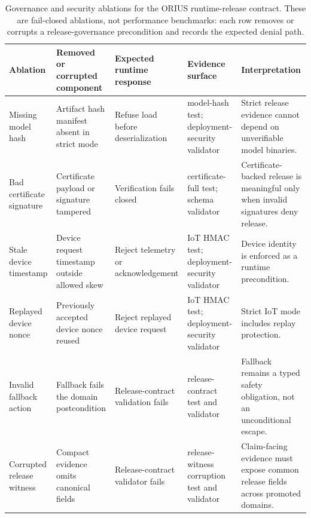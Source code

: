 \begin{table}[t]
\centering
\caption{Governance and security ablations for the ORIUS runtime-release contract. These are fail-closed ablations, not performance benchmarks: each row removes or corrupts a release-governance precondition and records the expected denial path.}
\label{tab:security-governance-ablations}
\footnotesize
\renewcommand{\arraystretch}{1.10}
\begin{tabularx}{\textwidth}{p{} p{} p{} p{} X}
\toprule
\textbf{Ablation} & \textbf{Removed or corrupted component} & \textbf{Expected runtime response} & \textbf{Evidence surface} & \textbf{Interpretation} \\
\midrule
Missing model hash & Artifact hash manifest absent in strict mode & Refuse load before deserialization & model-hash test; deployment-security validator & Strict release evidence cannot depend on unverifiable model binaries. \\
Bad certificate signature & Certificate payload or signature tampered & Verification fails closed & certificate-full test; schema validator & Certificate-backed release is meaningful only when invalid signatures deny release. \\
Stale device timestamp & Device request timestamp outside allowed skew & Reject telemetry or acknowledgement & IoT HMAC test; deployment-security validator & Device identity is enforced as a runtime precondition. \\
Replayed device nonce & Previously accepted device nonce reused & Reject replayed device request & IoT HMAC test; deployment-security validator & Strict IoT mode includes replay protection. \\
Invalid fallback action & Fallback fails the domain postcondition & Release-contract validation fails & release-contract test and validator & Fallback remains a typed safety obligation, not an unconditional escape. \\
Corrupted release witness & Compact evidence omits canonical fields & Release-contract validator fails & release-witness corruption test and validator & Claim-facing evidence must expose common release fields across promoted domains. \\
\bottomrule
\end{tabularx}
\end{table}
